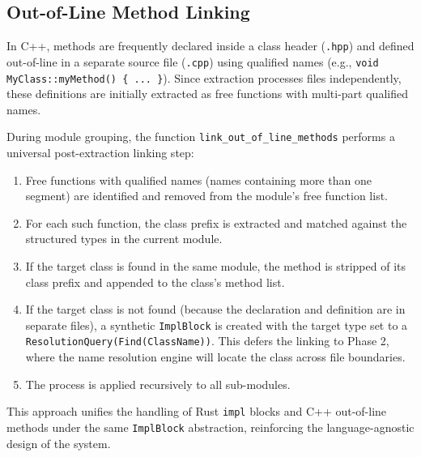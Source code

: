 \subsection{Out-of-Line Method Linking}
\label{sec:out_of_line}

In C++, methods are frequently declared inside a class header
(\texttt{.hpp}) and defined out-of-line in a separate source file
(\texttt{.cpp}) using qualified names (e.g., \texttt{void
MyClass::myMethod() \{ ... \}}). Since extraction processes files
independently, these definitions are initially extracted as free
functions with multi-part qualified names.

During module grouping, the function \texttt{link\_out\_of\_line\_methods}
performs a universal post-extraction linking step:

\begin{enumerate}
  \item Free functions with qualified names (names containing more
    than one segment) are identified and removed from the module's
    free function list.
  \item For each such function, the class prefix is extracted and
    matched against the structured types in the current module.
  \item If the target class is found in the same module, the method
    is stripped of its class prefix and appended to the class's method list.
  \item If the target class is not found (because the declaration and
    definition are in separate files), a synthetic \texttt{ImplBlock}
    is created with the target type set to a
    \texttt{ResolutionQuery(Find(ClassName))}. This defers the
    linking to Phase 2, where the name resolution engine will locate
    the class across file boundaries.
  \item The process is applied recursively to all sub-modules.
\end{enumerate}

This approach unifies the handling of Rust \texttt{impl} blocks and
C++ out-of-line methods under the same \texttt{ImplBlock}
abstraction, reinforcing the language-agnostic design of the system.
